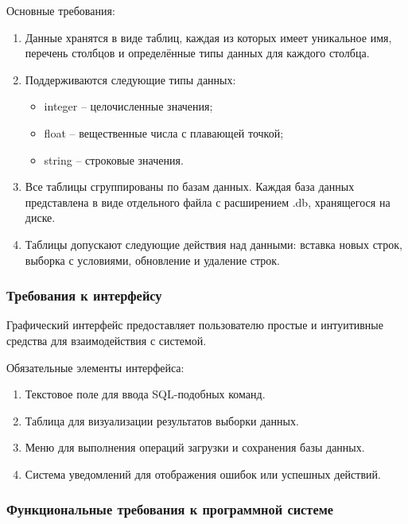 Основные требования:
\begin{enumerate}
	\item Данные хранятся в виде таблиц, каждая из которых имеет уникальное имя, перечень столбцов и определённые типы данных для каждого столбца.
	\item Поддерживаются следующие типы данных:
	\begin{itemize}
		\item integer -- целочисленные значения;
		\item float -- вещественные числа с плавающей точкой; 
		\item string -- строковые значения.
	\end{itemize}
	\item Все таблицы сгруппированы по базам данных. Каждая база данных представлена в виде отдельного файла с расширением .db, хранящегося на диске.
	\item Таблицы допускают следующие действия над данными: вставка новых строк, выборка с условиями, обновление и удаление строк.
\end{enumerate}

\subsubsection{Требования к интерфейсу}

Графический интерфейс предоставляет пользователю простые и интуитивные средства для взаимодействия с системой.

Обязательные элементы интерфейса:
\begin{enumerate}
	\item Текстовое поле для ввода SQL-подобных команд.		
	\item Таблица для визуализации результатов выборки данных.	
	\item Меню для выполнения операций загрузки и сохранения базы данных.	
	\item Система уведомлений для отображения ошибок или успешных действий.
\end{enumerate}

\subsubsection{Функциональные требования к программной системе}

